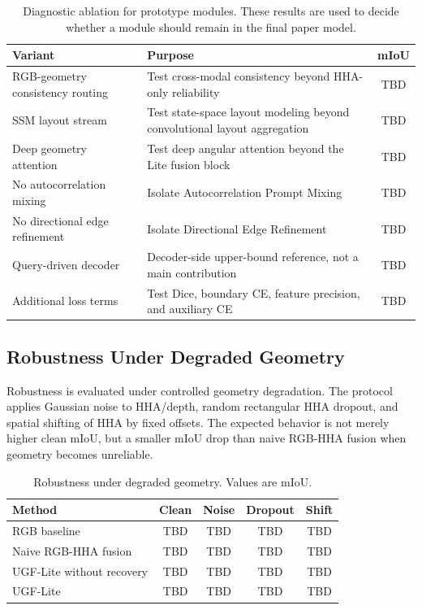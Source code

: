 \documentclass[a4paper,fleqn]{cas-dc}
\begin{document}
\begin{table}%
\caption{Diagnostic ablation for prototype modules. These results are used to decide whether a module should remain in the final paper model.}\label{tab:diagnostic}
\begin{tabular*}{\tblwidth}{@{\extracolsep{\fill}}p{}p{}c@{}}
\toprule
Variant & Purpose & mIoU \\
\midrule
RGB-geometry consistency routing & Test cross-modal consistency beyond HHA-only reliability & TBD \\
SSM layout stream & Test state-space layout modeling beyond convolutional layout aggregation & TBD \\
Deep geometry attention & Test deep angular attention beyond the Lite fusion block & TBD \\
No autocorrelation mixing & Isolate Autocorrelation Prompt Mixing & TBD \\
No directional edge refinement & Isolate Directional Edge Refinement & TBD \\
Query-driven decoder & Decoder-side upper-bound reference, not a main contribution & TBD \\
Additional loss terms & Test Dice, boundary CE, feature precision, and auxiliary CE & TBD \\
\bottomrule
\end{tabular*}
\end{table}

\subsection{Robustness Under Degraded Geometry}

Robustness is evaluated under controlled geometry degradation. The protocol applies Gaussian noise to HHA/depth, random rectangular HHA dropout, and spatial shifting of HHA by fixed offsets. The expected behavior is not merely higher clean mIoU, but a smaller mIoU drop than naive RGB-HHA fusion when geometry becomes unreliable.

\begin{table}%
\caption{Robustness under degraded geometry. Values are mIoU.}\label{tab:robust}
\begin{tabular*}{\tblwidth}{@{\extracolsep{\fill}}lcccc@{}}
\toprule
Method & Clean & Noise & Dropout & Shift \\
\midrule
RGB baseline & TBD & TBD & TBD & TBD \\
Naive RGB-HHA fusion & TBD & TBD & TBD & TBD \\
UGF-Lite without recovery & TBD & TBD & TBD & TBD \\
UGF-Lite & TBD & TBD & TBD & TBD \\
\bottomrule
\end{tabular*}
\end{table}
\end{document}
